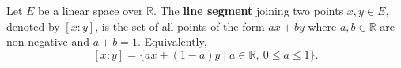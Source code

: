 Let $E$ be a linear space over $\mathbb{R}$. The \textbf{line segment} joining two points $x, y \in E$, denoted by $[x:y]$, is the set of all points of the form $a x + b y$ where $a, b \in \mathbb{R}$ are non-negative and $a + b = 1$. Equivalently,
$$
[x : y] = \{ a x + (1 - a) y \mid a \in \mathbb{R},\ 0 \leq a \leq 1 \}.
$$
